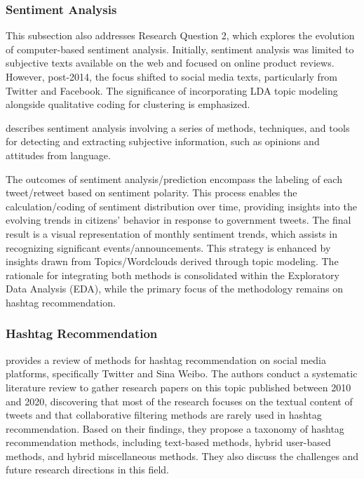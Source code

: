 \subsubsection{Sentiment Analysis}

This subsection also addresses Research Question 2, which explores the evolution of computer-based sentiment analysis. Initially, sentiment analysis was limited to subjective texts available on the web and focused on online product reviews. However, post-2014, the focus shifted to social media texts, particularly from Twitter and Facebook. The significance of incorporating LDA topic modeling alongside qualitative coding for clustering is emphasized.

\cite{liu2010sentiment} describes sentiment analysis involving a series of methods, techniques, and tools for detecting and extracting subjective information, such as opinions and attitudes from language.

The outcomes of sentiment analysis/prediction encompass the labeling of each tweet/retweet based on sentiment polarity. This process enables the calculation/coding of sentiment distribution over time, providing insights into the evolving trends in citizens' behavior in response to government tweets. The final result is a visual representation of monthly sentiment trends, which assists in recognizing significant events/announcements. This strategy is enhanced by insights drawn from Topics/Wordclouds derived through topic modeling. The rationale for integrating both methods is consolidated within the Exploratory Data Analysis (EDA), while the primary focus of the methodology remains on hashtag recommendation.

\subsubsection{Hashtag Recommendation}

\cite{alsini2021hashtag} provides a review of methods for hashtag recommendation on social media platforms, specifically Twitter and Sina Weibo. The authors conduct a systematic literature review to gather research papers on this topic published between 2010 and 2020, discovering that most of the research focuses on the textual content of tweets and that collaborative filtering methods are rarely used in hashtag recommendation. Based on their findings, they propose a taxonomy of hashtag recommendation methods, including text-based methods, hybrid user-based methods, and hybrid miscellaneous methods. They also discuss the challenges and future research directions in this field.

